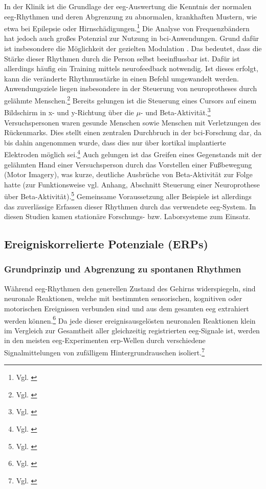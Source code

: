 In der Klinik ist die Grundlage der \acrshort{eeg}-Auswertung die Kenntnis der normalen \acrshort{eeg}-Rhythmen und deren Abgrenzung zu abnormalen, krankhaften Mustern, wie etwa bei Epilepsie oder Hirnschädigungen.\footnote{Vgl. \cite{nayak_waveforms}} Die Analyse von Frequenzbändern hat jedoch auch großes Potenzial zur Nutzung in \acrshort{bci}-Anwendungen. Grund dafür ist insbesondere die Möglichkeit der gezielten Modulation . Das bedeutet, dass die Stärke dieser Rhythmen durch die Person selbst beeinflussbar ist. Dafür ist allerdings häufig ein Training mittels \gls{neurofeedback} notwendig. Ist dieses erfolgt, kann die veränderte Rhythmusstärke in einen Befehl umgewandelt werden. Anwendungsziele liegen insbesondere in der Steuerung von \glspl{neuroprothese} durch gelähmte Menschen.\footnote{Vgl. \cite[S.~775--776]{wolpaw2002}} Bereits gelungen ist die Steuerung eines Cursors auf einem Bildschirm in x- und y-Richtung über die $\mu$- und Beta-Aktivität.\footnote{Vgl. \cite[S.~17849--17850]{wolpaw2004}} Versuchspersonen waren gesunde Menschen sowie Menschen mit Verletzungen des Rückenmarks. Dies stellt einen zentralen Durchbruch in der \acrshort{bci}-Forschung dar, da bis dahin angenommen wurde, dass dies nur über kortikal implantierte Elektroden möglich sei.\footnote{Vgl. \cite[S.~17849]{wolpaw2004}} Auch gelungen ist das Greifen eines Gegenstands mit der gelähmten Hand einer Versuchsperson durch das Vorstellen einer Fußbewegung (Motor Imagery), was kurze, deutliche Ausbrüche von Beta-Aktivität zur Folge hatte (zur Funktionsweise vgl. Anhang, Abschnitt \glqq Steuerung einer Neuroprothese über Beta-Aktivität\grqq{}).\footnote{Vgl. \cite[S.~33--36]{pfurtscheller2003}} Gemeinsame Voraussetzung aller Beispiele ist allerdings das zuverlässige Erfassen dieser Rhythmen durch das verwendete \acrshort{eeg}-System. In diesen Studien kamen stationäre Forschungs- bzw. Laborsysteme zum Einsatz. 

\subsection{Ereigniskorrelierte Potenziale (ERPs)}
\label{sec:erp}

\subsubsection{Grundprinzip und Abgrenzung zu spontanen Rhythmen}

Während \acrshort{eeg}-Rhythmen den generellen Zustand des Gehirns widerspiegeln, sind  neuronale Reaktionen, welche mit bestimmten sensorischen, kognitiven oder motorischen Ereignissen verbunden sind und aus dem gesamten \acrshort{eeg} extrahiert werden können.\footnote{Vgl. \cite[S.~4]{luck2005}} Da jede dieser ereignisausgelösten neuronalen Reaktionen klein im Vergleich zur Gesamtheit aller gleichzeitig registrierten \acrshort{eeg}-Signale ist, werden in den meisten \acrshort{eeg}-Experimenten \acrshort{erp}-Wellen durch verschiedene Signalmittelungen von zufälligem Hintergrundrauschen isoliert.\footnote{Vgl. \cite[S.~56]{luck2005}}

